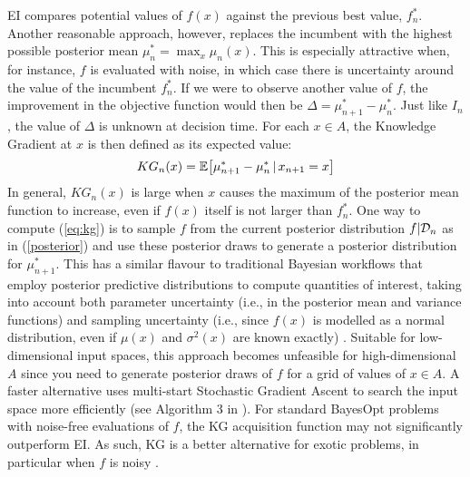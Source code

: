EI compares potential values of $f(x)$ against the previous best value, $f_n^*$. Another reasonable approach, however, replaces the incumbent with the highest possible posterior mean $\mu_{n}^*=\max_x \mu_n(x)$. This is especially attractive when, for instance, $f$ is evaluated with noise, in which case there is uncertainty around the value of the incumbent $f_n^*$. If we were to observe another value of $f$, the improvement in the objective function would then be $\Delta = \mu_{n+1}^*-\mu_{n}^*$. Just like $I_n$, the value of $\Delta$ is unknown at decision time. For each $x\in A$, the Knowledge Gradient at $x$ is then defined as its expected value:
\begin{align}
    KG_n(x) = \mathbb{E}\big[\mu_{n+1}^*-\mu_{n}^*\,\vert\, x_{n+1}=x\big]\label{eq:kg}
\end{align}
In general, $KG_n(x)$ is large when $x$ causes the maximum of the posterior mean function to increase, even if $f(x)$ itself is not larger than $f_n^*$. One way to compute (\ref{eq:kg}) is to sample $f$ from the current posterior distribution $f\vert\mathcal{D}_n$ as in (\ref{posterior}) and use these posterior draws to generate a posterior distribution for $\mu_{n+1}^*$. This has a similar flavour to traditional Bayesian workflows that employ posterior predictive distributions to compute quantities of interest, taking into account both parameter uncertainty (i.e., in the posterior mean and variance functions) and sampling uncertainty (i.e., since $f(x)$ is modelled as a normal distribution, even if $\mu(x)$ and $\sigma^2(x)$ are known exactly) \cite{Gelman2013}. Suitable for low-dimensional input spaces, this approach becomes unfeasible for high-dimensional $A$ since you need to generate posterior draws of $f$ for a grid of values of $x\in A$. A faster alternative uses multi-start Stochastic Gradient Ascent to search the input space more efficiently (see Algorithm 3 in ). For standard BayesOpt problems with noise-free evaluations of $f$, the KG acquisition function may not significantly outperform EI. As such, KG is a better alternative for exotic problems, in particular when $f$ is noisy \cite{Frazier2018}.


